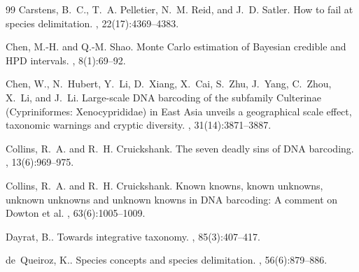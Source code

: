 \documentclass[12pt]{article}
\begin{document}
\begin{thebibliography}{99}
Carstens, B.~C., T.~A. Pelletier, N.~M. Reid, and J.~D.
  Satler\leavevmode\nopagebreak{}.
\newblock How to fail at species delimitation.
, 22(17):4369--4383.

Chen, M.-H. and Q.-M. Shao\leavevmode\nopagebreak{}.
\newblock Monte {C}arlo estimation of {B}ayesian credible and {HPD} intervals.
, 8(1):69--92.

Chen, W., N.~Hubert, Y.~Li, D.~Xiang, X.~Cai, S.~Zhu, J.~Yang, C.~Zhou, X.~Li,
  and J.~Li\leavevmode\nopagebreak{}.
\newblock Large-scale {DNA} barcoding of the subfamily {C}ulterinae
  ({C}ypriniformes: {X}enocyprididae) in {E}ast {A}sia unveils a geographical
  scale effect, taxonomic warnings and cryptic diversity.
, 31(14):3871--3887.

Collins, R.~A. and R.~H. Cruickshank\leavevmode\nopagebreak{}.
\newblock The seven deadly sins of {DNA} barcoding.
, 13(6):969--975.

Collins, R.~A. and R.~H. Cruickshank\leavevmode\nopagebreak{}.
\newblock Known knowns, known unknowns, unknown unknowns and unknown knowns in
  {DNA} barcoding: A comment on {D}owton et al.
, 63(6):1005--1009.

Dayrat, B.\leavevmode\nopagebreak{}.
\newblock Towards integrative taxonomy.
, 85(3):407--417.

de~Queiroz, K.\leavevmode\nopagebreak{}.
\newblock Species concepts and species delimitation.
, 56(6):879--886.


\end{thebibliography}
\end{document}
